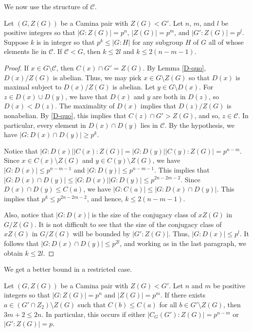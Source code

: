 We now use the structure of $\mathcal C$.

\begin{lemma}\label{inter}
Let $(G,Z (G))$ be a Camina pair with $Z (G) < G'$.  Let $n$, $m$, and $l$ be positive integers so that $|G:Z(G)| = p^n$, $|Z(G)| = p^{m}$, and $|G':Z(G)| = p^l$.  Suppose $k$ is in integer so that $p^k \le |G:H|$ for any subgroup $H$ of $G$ all of whose elements lie in ${\mathcal C}$.  If ${\mathcal C} < G$, then $k \le 2l$ and $k \le 2(n-m-1)$.
\end{lemma}

\begin{proof}
If $x \in G \setminus {\mathcal C}$, then $C (x) \cap G' = Z(G)$.  By Lemma \ref{D-quo}, $D (x)/Z (G)$ is abelian.  Thus, we may pick $x \in G \setminus Z(G)$ so that $D(x)$ is maximal subject to $D(x)/Z(G)$ is abelian.  Let $y \in G \setminus D(x)$.  For $z \in D(x) \cup D(y)$, we have that $D (x)$ and $y$ are both in $D (z)$, so $D (x) < D (z)$.  The maximality of $D (x)$ implies that $D (z)/Z(G)$ is nonabelian.  By \ref{D-quo}, this implies that $C (z) \cap G' > Z (G)$, and so, $z \in {\mathcal C}$.  In particular, every element in $D(x) \cap D (y)$ lies in ${\mathcal C}$.  By the hypothesis, we have $|G:D (x) \cap D (y)| \ge p^k$.

Notice that $|G:D (x)||C (x):Z (G)| = |G:D (y)||C (y):Z (G)| = p^{n-m}$.  Since $x \in C (x) \setminus Z (G)$ and $y \in C (y) \setminus Z (G)$, we have $|G:D (x)| \le p^{n-m-1}$ and $|G:D (y)| \le p^{n-m-1}$.  This implies that $|G: D (x) \cap D (y)| \le |G:D (x)||G:D (y)| \le p^{2n-2m-2}$.  Since $D (x) \cap D(y) \le C (a)$, we have $|G: C (a)| \le |G:D (x) \cap D (y)|$.  This implies that $p^{k} \le p^{2n-2m-2}$, and hence, $k \le 2(n - m - 1)$.

Also, notice that $|G:D (x)|$ is the size of the conjugacy class of $x Z (G)$ in $G/Z (G)$.  It is not difficult to see that the size of the conjugacy class of $x Z (G)$ in $G/Z (G)$ will be bounded by $|G':Z(G)|$.  Thus, $|G:D (x)| \le p^l$.  It follows that $|G: D (x) \cap D (y)| \le p^{2l}$, and working as in the last paragraph, we obtain $k \le 2l$.
\end{proof}

We get a better bound in a restricted case.

\begin{corollary} \label{small}
Let $(G,Z(G))$ be a Camina pair with $Z (G) < G'$.  Let $n$ and $m$ be positive integers so that $|G:Z (G)| = p^n$ and $|Z (G)| = p^{m}$.  If there exists $a \in (G' \cap Z_2) \setminus Z (G)$ such that $C (b) \le C (a)$ for all $b \in G' \setminus Z (G)$, then $3m + 2 \le 2n$.  In particular, this occurs if either $|C_G (G'): Z(G)| = p^{n-m}$ or $|G':Z(G)| = p$.
\end{corollary}

